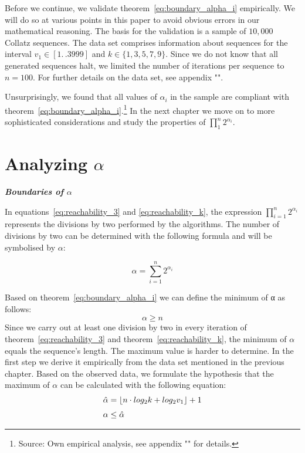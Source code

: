 \documentclass{SciPress_2015}
\renewcommand{\subsection}[1]{\textit{\textbf{#1}}}
\begin{document}
Before we continue, we validate theorem~\ref{eq:boundary_alpha_i} empirically. We will do so at various points in this paper to avoid obvious errors in our mathematical reasoning. The basis for the validation is a sample of $10,000$ Collatz sequences. The data set comprises information about sequences for the interval $v_1\in[1\mathrel{{.}\,{.}}3999]$ and $k\in\{1,3,5,7,9\}$. Since we do not know that all generated sequences halt, we limited the number of iterations per sequence to $n=100$. For further details on the data set, see appendix "".

Unsurprisingly, we found that all values of $\alpha_i$ in the sample are compliant with theorem~\ref{eq:boundary_alpha_i}.\footnote{Source: Own empirical analysis, see appendix "" for details.} In the next chapter we move on to more sophisticated considerations and study the properties of $\prod_{1}^{n}2^{\alpha_i}$.

\section{Analyzing \boldmath$\alpha$}
\label{sec:analysing_alpha}
\subsection{Boundaries of \boldmath$\alpha$}
\par\noindent
In equations~\ref{eq:reachability_3} and \ref{eq:reachability_k}, the expression $\prod_{i=1}^{n}2^{\alpha_i}$  represents the divisions by two performed by the algorithms. The number of divisions by two can be determined with the following formula and will be symbolised by $\alpha$:

\begin{equation}
\label{eq:sum_alpha}
\alpha=\sum_{i=1}^{n}2^{\alpha_i}
\end{equation}

\newpage
\par\noindent
Based on theorem~\ref{eq:boundary_alpha_i} we can define the minimum of α as follows:
\[
\alpha\ge n
\]
Since we carry out at least one division by two in every iteration of theorem~\ref{eq:reachability_3} and theorem~\ref{eq:reachability_k}, the minimum of $\alpha$ equals the sequence's length. The maximum value is harder to determine. In the first step we derive it empirically from the data set mentioned in the previous chapter. Based on the observed data, we formulate the hypothesis that the maximum of $\alpha$ can be calculated with the following equation:
\begin{equation}
\label{eq:max_alpha}
\begin{array}{l}
\hat\alpha=\lfloor n\cdot log_2k+log_2v_1\rfloor+1\\[\medskipamount]
\alpha\le\hat\alpha
\end{array}	
\end{equation}
\end{document}
